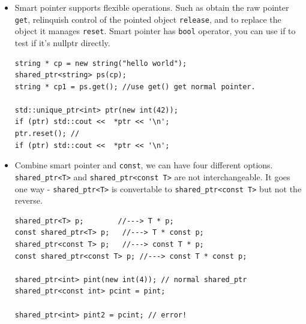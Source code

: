\documentclass[a4paper,11pt,twoside]{book}
\begin{document}
\begin{itemize}
\item Smart pointer supports flexible operations. Such as obtain the raw pointer \texttt{get}, relinquish control of the pointed object \texttt{release}, and to replace the object it manages \texttt{reset}. Smart pointer has \texttt{bool} operator, you can use if to test if it's nullptr directly.

\begin{lstlisting}[numbers=none]
string * cp = new string("hello world");
shared_ptr<string> ps(cp);
string * cp1 = ps.get(); //use get() get normal pointer.

std::unique_ptr<int> ptr(new int(42));
if (ptr) std::cout <<  *ptr << '\n';
ptr.reset(); //
if (ptr) std::cout <<  *ptr << '\n';
\end{lstlisting}

\item Combine smart pointer and \texttt{const}, we can have four different options. \texttt{shared\_ptr<T>} and \texttt{shared\_ptr<const T>} are not interchangeable. It goes one way - \texttt{shared\_ptr<T>} is convertable to \texttt{shared\_ptr<const T>} but not the reverse.
\begin{lstlisting}[numbers=none]
shared_ptr<T> p;        //---> T * p;
const shared_ptr<T> p;   //---> T * const p;
shared_ptr<const T> p;   //---> const T * p;
const shared_ptr<const T> p; //---> const T * const p;

shared_ptr<int> pint(new int(4)); // normal shared_ptr
shared_ptr<const int> pcint = pint;
 
shared_ptr<int> pint2 = pcint; // error! 
\end{lstlisting}


\end{itemize}
\end{document}
